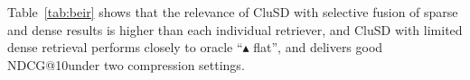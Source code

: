 Table~\ref{tab:beir} shows
that the relevance of CluSD with selective fusion of sparse and dense results is higher than each individual retriever,
and CluSD with limited dense retrieval   performs  closely to   oracle ``$\blacktriangle$ flat'',
and delivers good NDCG@10under two compression settings.
  
